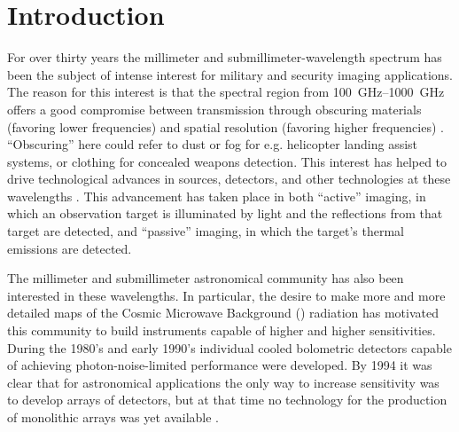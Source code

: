 \chapter{Introduction} \label{c:intro}


For over thirty years the millimeter and submillimeter-wavelength spectrum has been the subject of intense interest for military and security imaging applications.
The reason for this interest is that the spectral region from \SIrange{100}{1000}{\GHz} offers a good compromise between transmission through obscuring materials (favoring lower frequencies) and spatial resolution (favoring higher frequencies) \cite{kruse_why_1981}.
``Obscuring'' here could refer to dust or fog for e.g. helicopter landing assist systems, or clothing for concealed weapons detection.
This interest has helped to drive technological advances in sources, detectors, and other technologies at these wavelengths \cite{popovic_thz_2011,rogalski_terahertz_2011,rieke_detection_2003}.
This advancement has taken place in both ``active'' imaging, in which an observation target is illuminated by light and the reflections from that target are detected, and ``passive'' imaging, in which the target's thermal emissions are detected.

The millimeter and submillimeter astronomical community has also been interested in these wavelengths.
In particular, the desire to make more and more detailed maps of the Cosmic Microwave Background (\CMB) radiation has motivated this community to build instruments capable of higher and higher sensitivities.
During the 1980's and early 1990's individual cooled bolometric detectors capable of achieving photon-noise-limited performance were developed.
By 1994 it was clear that for astronomical applications the only way to increase sensitivity was to develop arrays of detectors, but at that time no technology for the production of monolithic arrays was yet available \cite{richards_bolometers_1994}.


